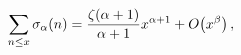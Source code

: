 \[\sum_{n\leq x}\mathop{\sigma_{\alpha}\/}\nolimits\!\left(n\right)=\frac{%
\mathop{\zeta\/}\nolimits\!\left(\alpha+1\right)}{\alpha+1}x^{\alpha+1}+%
\mathop{O\/}\nolimits\!\left(x^{\beta}\right),\]